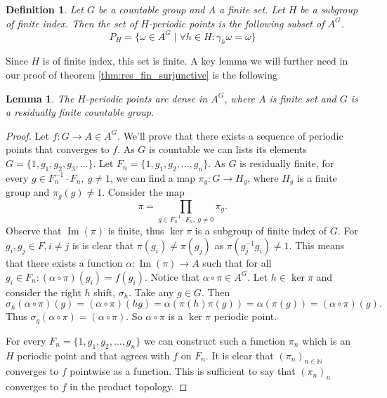 \documentclass[titlepage, a4paper]{article}
\newcommand{\N}{\mathbb{N}}
\DeclareMathOperator{\im}{Im}
\newtheorem{definition}{Definition}
\newtheorem{lemma}{Lemma}
\theoremstyle{remark}
\begin{document}
    \begin{definition}
        Let $G$ be a countable group and $A$ a finite set. Let $H$ be a subgroup of finite index. Then the set of $H$-periodic points is the following subset of $A^G$.
        \[
        P_H = \{ \omega \in A^G  \mid \forall h \in H: \gamma_h\omega = \omega\}
        \]
    \end{definition}

    Since $H$ is of finite index, this set is finite. %
    A key lemma we will further need in our proof of theorem \ref{thm:res_fin_surjunctive} is the following

    \begin{lemma} \label{lem:h-periodic_points}
    The $H$-periodic points are dense in $A^G$, where $A$ is finite set and $G$ is a residually finite countable group.
    \end{lemma}
    \begin{proof}
        Let $f:G \to A \in A^G$. We'll prove that there exists a sequence of periodic points that converges to $f$. As $G$ is countable we can lists its elements $G = \{1, g_1, g_2, g_3,\dots\}$. 
        Let $F_n = \{1, g_1, g_2, \dots, g_n\}$. 
        As $G$ is residually finite, for every $g \in F_n^{-1} \cdot F_n,\ g \ne 1$, we can find a map $\pi_g: G \to H_g$, where $H_g$ is a finite group and $\pi_g(g) \ne 1$.  Consider the map \[\pi = \prod_{g\in  F_n^{-1} \cdot F_n,\ g\ne 0} \pi_g
        .\]
        Observe that $\im(\pi)$ is finite, thus $\ker\pi$ is a subgroup of finite index of $G$. 
        For $g_i, g_j \in F, i \ne j$ is is clear that $\pi(g_i) \ne \pi(g_j)$ as $\pi(g_j^{-1} g_i) \ne 1$. 
        This means that there exists a function $\alpha: \im(\pi) \to A$ such that for all $g_i \in F_n: (\alpha \circ \pi)(g_i) = f(g_i)$. 
        Notice that $\alpha \circ \pi \in A^G$. 
        Let $h \in \ker\pi$ and consider the right $h$ shift, $\sigma_h$. 
        Take any $g \in G$. 
        Then 
        \[\sigma_h(\alpha\circ\pi)(g) = (\alpha \circ \pi)(hg) = \alpha(\pi(h)\pi(g)) = \alpha(\pi(g)) = (\alpha\circ\pi)(g).\] Thus $\sigma_g(\alpha \circ \pi) = (\alpha\circ\pi)$.
        So $\alpha\circ\pi$ is a $\ker\pi$ periodic point. 

        For every $F_n =  \{1, g_1, g_2, \dots, g_n\}$ we can construct such a function $\pi_n$ which is an $H$ periodic point and that agrees with $f$ on $F_n$. It is clear that $(\pi_n)_{n\in\N}$ converges to $f$ pointwise as a function. This is sufficient to say that $(\pi_n)_n$ converges to $f$ in the product topology.
    \end{proof}
\end{document}

